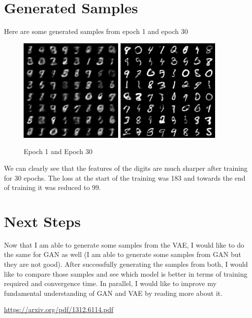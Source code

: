 \documentclass{article}
\begin{document}
\section{Generated Samples}
Here are some generated samples from epoch 1 and epoch 30

\begin{figure}[H]
  \centering
  \includegraphics[width=2in]{src/results/sample_1.png}
  \includegraphics[width=2in]{src/results/sample_30.png}
  \caption{Epoch 1 and Epoch 30}
\end{figure}
We can clearly see that the features of the digits are much sharper after training for 30 epochs. The loss at the start of the training was 183 and towards the end of training it was reduced to 99.

\section{Next Steps}

Now that I am able to generate some samples from the VAE, I would like to do the same for GAN as well (I am able to generate some samples from GAN but they are not good). After successfully generating the samples from both, I would like to compare those samples and see which model is better in terms of training required and convergence time. In parallel, I would like to improve my fundamental understanding of GAN and VAE by reading more about it.

\begin{thebibliography}{1}

 \url{https://arxiv.org/pdf/1312.6114.pdf}

\end{thebibliography}
\end{document}
